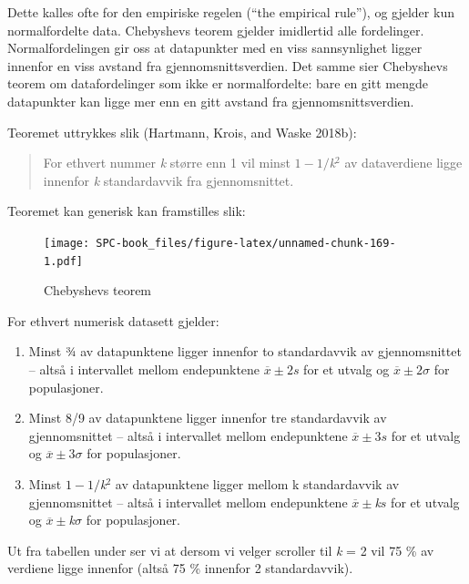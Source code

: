 \documentclass[
]{book}
\providecommand{\tightlist}{%
  \setlength{\itemsep}{0pt}\setlength{\parskip}{0pt}}
\begin{document}
Dette kalles ofte for den empiriske regelen (``the empirical rule''), og gjelder kun normalfordelte data. Chebyshevs teorem gjelder imidlertid alle fordelinger. Normalfordelingen gir oss at datapunkter med en viss sannsynlighet ligger innenfor en viss avstand fra gjennomsnittsverdien. Det samme sier Chebyshevs teorem om datafordelinger som ikke er normalfordelte: bare en gitt mengde datapunkter kan ligge mer enn en gitt avstand fra gjennomsnittsverdien.

Teoremet uttrykkes slik (Hartmann, Krois, and Waske 2018b):

\begin{quote}
For ethvert nummer \emph{k} større enn 1 vil minst \(1-1/\)\emph{k}\(^2\) av dataverdiene ligge innenfor \emph{k} standardavvik fra gjennomsnittet.
\end{quote}

Teoremet kan generisk kan framstilles slik:

\begin{figure}
\centering
\texttt{[image: SPC-book\_files/figure-latex/unnamed-chunk-169-1.pdf]}
\caption{\label{fig:unnamed-chunk-169}Chebyshevs teorem}
\end{figure}

For ethvert numerisk datasett gjelder:

\begin{enumerate}
\def\labelenumi{\arabic{enumi}.}
\tightlist
\item
  Minst ¾ av datapunktene ligger innenfor to standardavvik av gjennomsnittet -- altså i intervallet mellom endepunktene \(\overline{x}\pm2s\) for et utvalg og \(\overline{x}\pm2\sigma\) for populasjoner.
\item
  Minst 8/9 av datapunktene ligger innenfor tre standardavvik av gjennomsnittet -- altså i intervallet mellom endepunktene \(\overline{x}\pm3s\) for et utvalg og \(\overline{x}\pm3\sigma\) for populasjoner.
\item
  Minst \(1-1/\)\emph{k}\(^2\) av datapunktene ligger mellom k standardavvik av gjennomsnittet -- altså i intervallet mellom endepunktene \(\overline{x}\pm\)\emph{k}\(s\) for et utvalg og \(\overline{x}\pm\)\emph{k}\(\sigma\) for populasjoner.
\end{enumerate}

Ut fra tabellen under ser vi at dersom vi velger scroller til \emph{k} = 2 vil 75 \% av verdiene ligge innenfor (altså 75 \% innenfor 2 standardavvik).
\end{document}
